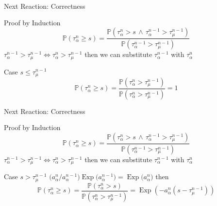 \documentclass{beamer}
\DeclareMathOperator{\Exp}{\text{Exp}}
\begin{document}
\begin{frame}{Next Reaction: Correctness}
  \begin{block}{Proof by Induction}
    \begin{equation*}
      \mathbb{P}\left(\tau^n_\alpha \geq s\right) =
      \frac{\mathbb{P}\left(\tau^n_\alpha > s \, \land \, \tau^{n-1}_\alpha > \tau^{n-1}_\mu \right)}{
        \mathbb{P}\left(\tau^{n-1}_\alpha > \tau^{n-1}_\mu \right)}
    \end{equation*}
    $\tau^{n-1}_\alpha > \tau^{n-1}_\mu \iff \tau^n_\alpha > \tau^{n-1}_\mu$ then we can
    substitute $\tau_\alpha^{n-1}$ with $\tau_\alpha^{n}$
\pause
    \begin{center}
      \begin{minipage}{.8 \textwidth}
        \begin{block}{Case $s \leq \tau_\mu^{n-1}$}
          \begin{equation*}
            \mathbb{P}\left(\tau^n_\alpha \geq s\right) =
            \frac{\mathbb{P}\left(\tau^{n}_\alpha > \tau^{n-1}_\mu \right)}
            {\mathbb{P}\left(\tau^{n}_\alpha > \tau^{n-1}_\mu \right)} = 1
         \end{equation*}
        \end{block}
      \end{minipage}
    \end{center} 
  \end{block}
\end{frame}

\begin{frame}{Next Reaction: Correctness}
  \begin{block}{Proof by Induction}
    \begin{equation*}
      \mathbb{P}\left(\tau^n_\alpha \geq s\right) =
      \frac{\mathbb{P}\left(\tau^n_\alpha > s \, \land \, \tau^{n-1}_\alpha > \tau^{n-1}_\mu \right)}{
        \mathbb{P}\left(\tau^{n-1}_\alpha > \tau^{n-1}_\mu \right)}
    \end{equation*}
    $\tau^{n-1}_\alpha > \tau^{n-1}_\mu \iff \tau^n_\alpha > \tau^{n-1}_\mu$ then we can
    substitute $\tau_\alpha^{n-1}$ with $\tau_\alpha^{n}$
    \begin{center}
      \begin{minipage}{.8 \textwidth}
        \begin{block}{Case $s > \tau_\mu^{n-1}$}
          $\bigl(a_\alpha^n \big/ a_\alpha^{n-1}\bigl) \Exp\bigl(a_\alpha^{n-1}\bigr) =
          \Exp\bigl(a_\alpha^{n}\bigr)$ then
          \begin{equation*}
            \mathbb{P}\left(\tau^n_\alpha \geq s\right) =
            \frac{\mathbb{P}\left(\tau^{n}_\alpha > s \right)}
            {\mathbb{P}\left(\tau^{n}_\alpha > \tau^{n-1}_\mu \right)} =
            \Exp\left(-a_\alpha^n \left(s - \tau_\mu^{n-1}\right)\right)
         \end{equation*}
        \end{block}
      \end{minipage}
    \end{center} 
  \end{block}
\end{frame}
\end{document}
